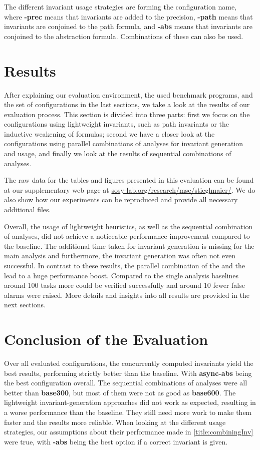 The different invariant usage strategies are forming the configuration name, where \textbf{-prec} means that invariants are added to the precision, \textbf{-path} means that invariants are conjoined to the path formula, and \textbf{-abs} means that invariants are conjoined to the abstraction formula. Combinations of these can also be used.

\section{Results}
After explaining our evaluation environment, the used benchmark programs, and the set of configurations in the last sections, we take a look at the results of our evaluation process. This section is divided into three parts: first we focus on the configurations using lightweight invariants, such as path invariants or the inductive weakening of formulas; second we have a closer look at the configurations using parallel combinations of analyses for invariant generation and usage, and finally we look at the results of sequential combinations of analyses.

The raw data for the tables and figures presented in this evaluation can be found at our supplementary web page at \url{sosy-lab.org/research/msc/stieglmaier/}. We do also show how our experiments can be reproduced and provide all necessary
additional files.

Overall, the usage of lightweight heuristics, as well as the sequential combination of analyses, did not achieve a noticeable performance improvement compared to the baseline.
The additional time taken for invariant generation is missing for the main analysis and furthermore, the invariant generation was often not even successful. In contrast to these
results, the parallel combination of the \PredicateCPA{} and the \InvariantsCPA{} lead to a huge performance boost. Compared to the single analysis baselines around \num{100}
tasks more could be verified successfully and around \num{10} fewer false alarms were raised. More details and insights into all results are provided in the next sections.






\section{Conclusion of the Evaluation}
Over all evaluated configurations, the concurrently computed invariants yield the best results, performing strictly better than the baseline.
With \textbf{async-abs} being the best configuration overall. The sequential combinations of analyses were all better 
than \textbf{base300}, but most of them were not as good as \textbf{base600}. The lightweight invariant-generation approaches did not work as expected, resulting in a worse performance than the baseline. 
They still need more work to make them faster and the results more reliable. 
When looking at the different usage strategies, our assumptions about their performance made in \autoref{title:combiningInv} were true, with \textbf{-abs} being the best option if a correct invariant is 
given.



